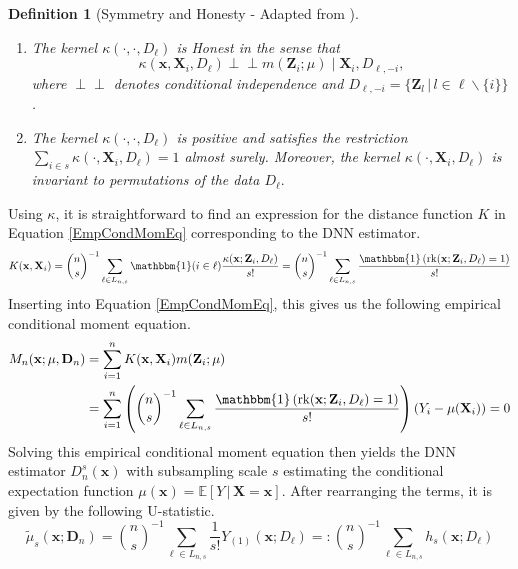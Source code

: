 \documentclass[letterpaper,10pt]{article}
\numberwithin{equation}{section}
\numberwithin{thm}{section}
\newtheorem{dfn}{Definition}
\numberwithin{lem}{section}
\numberwithin{cor}{section}
\newcommand{\1}{\mathbb{1}}
\newcommand{\indep}{\perp\!\!\!\!\perp}
\begin{document}
\begin{dfn}[Symmetry and Honesty - Adapted from \citet{ritzwoller_uniform_2024}]\label{Symmetry_Honesty}\mbox{}
	\begin{enumerate}
		\item The kernel $\kappa\left(\cdot, \cdot, D_{\ell}\right)$ is Honest in the sense that
		      $$\kappa\left(\mathbf{x}, \mathbf{X}_i, D_{\ell}\right) \indep m\left(\mathbf{Z}_i ; \mu\right) \mid \mathbf{X}_i, D_{\ell,-i},$$
		      where $\indep$ denotes conditional independence and $D_{\ell,-i} = \{\mathbf{Z}_l \, | \, l \in \ell \backslash \{i\}\}$.
		\item The kernel $\kappa\left(\cdot, \cdot, D_{\ell}\right)$ is positive and satisfies the restriction
		      $\sum_{i \in s} \kappa\left(\cdot, \mathbf{X}_i, D_{\ell}\right)=1$ almost surely.
		      Moreover, the kernel $\kappa\left(\cdot, \mathbf{X}_i, D_{\ell}\right)$ is invariant to permutations of the data $D_{\ell}.$
	\end{enumerate}
\end{dfn}
Using $\kappa$, it is straightforward to find an expression for the distance function $K$ in Equation \ref{EmpCondMomEq} corresponding to the DNN estimator.
\begin{equation}
	K(\mathbf{x}, \mathbf{X}_i)
	= \binom{n}{s}^{-1} \sum_{\ell \in L_{n,s}} \mathbbm{1}(i \in \ell)\frac{\kappa(\mathbf{x}; \mathbf{Z}_i, D_{\ell})}{s!}
	= \binom{n}{s}^{-1} \sum_{\ell \in L_{n,s}} \frac{\mathbbm{1}\left(\operatorname{rk}(\mathbf{x}; \mathbf{Z}_i, D_{\ell}) = 1\right)}{s!}
\end{equation}
Inserting into Equation \ref{EmpCondMomEq}, this gives us the following empirical conditional moment equation.
\begin{equation}
	\begin{aligned}
		M_n(\mathbf{x}; \mu, \mathbf{D}_n)
		 & = \sum_{i = 1}^{n}K(\mathbf{x}, \mathbf{X}_i)m(\mathbf{Z}_i; \mu)                                                                                                                                         \\
		 & = \sum_{i = 1}^{n}\left(\binom{n}{s}^{-1} \sum_{\ell \in L_{n,s}} \frac{\mathbbm{1}\left(\operatorname{rk}(\mathbf{x}; \mathbf{Z}_i, D_{\ell}) = 1\right)}{s!}\right)\left(Y_i - \mu(\mathbf{X}_i)\right)
		= 0
	\end{aligned}
\end{equation}
Solving this empirical conditional moment equation then yields the DNN estimator $D_{n}^{s}(\mathbf{x})$ with subsampling scale $s$ estimating the conditional expectation function $\mu(\mathbf{x}) = \mathbb{E}\left[Y \, | \, \mathbf{X} = \mathbf{x}\right]$.
After rearranging the terms, it is given by the following U-statistic.
\begin{equation}\label{U_stat}
	\tilde{\mu}_{s}(\mathbf{x}; \mathbf{D}_n)
	= \binom{n}{s}^{-1} \sum_{\ell \in L_{n,s}} \frac{1}{s!} Y_{(1)}(\mathbf{x}; D_{\ell})
	=: \binom{n}{s}^{-1} \sum_{\ell \in L_{n,s}} h_{s}(\mathbf{x}; D_{\ell})
\end{equation}
\end{document}
